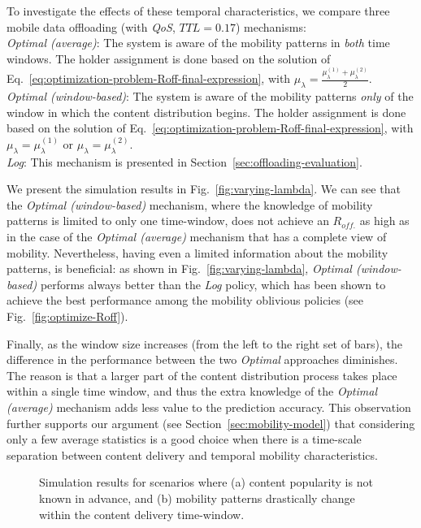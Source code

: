 \documentclass[journal]{IEEEtran}
\newcommand{\eq}[1]{Eq.~\eqref{#1}}
\newcommand{\revisionRed}[1]{{#1}}\newcommand{\red}[1]{{#1}}
\begin{document}
\revisionRed{
To investigate the effects of these temporal characteristics, we compare three mobile data offloading (with \textit{QoS}, $TTL=0.17$) mechanisms:\\
{\textit{Optimal (average)}}: The system is aware of the mobility patterns in \textit{both} time windows. The holder assignment is done based on the solution of \eq{eq:optimization-problem-Roff-final-expression}, with $\mu_{\lambda} = \frac{\mu_{\lambda}^{(1)}+\mu_{\lambda}^{(2)}}{2}$.\\
{\textit{Optimal (window-based)}}: The system is aware of the mobility patterns \textit{only} of the window in which the content distribution begins. The holder assignment is done based on the solution of \eq{eq:optimization-problem-Roff-final-expression}, with $\mu_{\lambda} =\mu_{\lambda}^{(1)}$ or $\mu_{\lambda} =\mu_{\lambda}^{(2)}$.\\
{\textit{Log}}: This mechanism is presented in Section~\ref{sec:offloading-evaluation}.
}

\revisionRed{
We present the simulation results in Fig.~\ref{fig:varying-lambda}. We can see that the \textit{Optimal (window-based)} mechanism, where the knowledge of mobility patterns is limited to only one time-window, does not achieve an $R_{off.}$ as high as in the case of the \textit{Optimal (average)} mechanism that has a complete view of mobility. Nevertheless, having even a limited information about the mobility patterns, is beneficial: as shown in Fig.~\ref{fig:varying-lambda}, \textit{Optimal (window-based)} performs always better than the \textit{Log} policy, which has been shown to achieve the best performance among the mobility oblivious policies (see Fig.~\ref{fig:optimize-Roff}).
}

\revisionRed{
Finally, as the window size increases (from the left to the right set of bars), the difference in the performance between the two \textit{Optimal} approaches diminishes. The reason is that a larger part of the content distribution process takes place within a single time window, and thus the extra knowledge of the \textit{Optimal (average)} mechanism adds less value to the prediction accuracy. This observation further supports our argument (see Section~\ref{sec:mobility-model}) that considering only a few average statistics is a good choice when there is a time-scale separation between content delivery and temporal mobility characteristics.
}

\begin{figure}
\caption{\revisionRed{Simulation results for scenarios where (a) content popularity is not known in advance, and (b) mobility patterns drastically change within the content delivery time-window. }}
\label{fig:offloading-extensions}
\end{figure}
\end{document}
